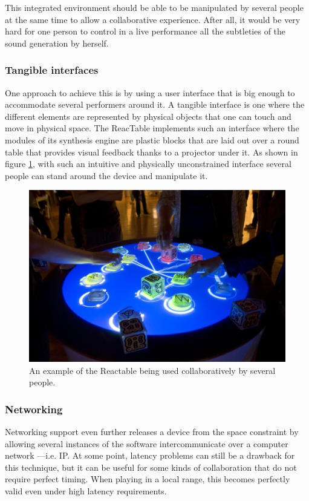 This integrated environment should be able to be manipulated by
several people at the same time to allow a collaborative
experience. After all, it would be very hard for one person to control
in a live performance all the subtleties of the sound generation by
herself.

\subsubsection{Tangible interfaces}

One approach to achieve this is by using a user interface that is big
enough to accommodate several performers around it. A tangible
interface is one where the different elements are represented by
physical objects that one can touch and move in physical space.  The
ReacTable implements such an interface where the modules of its
synthesis engine are plastic blocks that are laid out over a round
table that provides visual feedback thanks to a projector under it. As
shown in figure \ref{fig:reactable}, with such an intuitive and
physically unconstrained interface several people can stand around the
device and manipulate it.

\begin{figure}[h!]
\centering
\includegraphics[width=.7\textwidth]{pic/reactable.jpg}
\caption{An example of the Reactable being used collaboratively by
  several people.}
\label{fig:reactable}
\end{figure}

\subsubsection{Networking}

Networking support even further releases a device from the space
constraint by allowing several instances of the software
intercommunicate over a computer network ---i.e. IP. At some point,
latency problems can still be a drawback for this technique, but it
can be useful for some kinds of collaboration that do not require
perfect timing. When playing in a local range, this becomes perfectly
valid even under high latency requirements.

